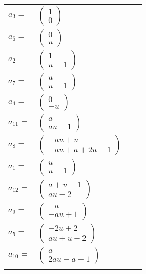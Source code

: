 \documentclass[1p]{elsarticle_modified}
\theoremstyle{definition}
\begin{document}
\begin{tabular}{m{7pt} m{180pt} m{7pt} m{180pt} }
\flushright $a_{3}=$&$\begin{pmatrix}1\\0\end{pmatrix}$ \\
\flushright $a_{6}=$&$\begin{pmatrix}0\\u\end{pmatrix}$ \\
\flushright $a_{2}=$&$\begin{pmatrix}1\\u-1\end{pmatrix}$ \\
\flushright $a_{7}=$&$\begin{pmatrix}u\\u-1\end{pmatrix}$ \\
\flushright $a_{4}=$&$\begin{pmatrix}0\\- u\end{pmatrix}$ \\
\flushright $a_{11}=$&$\begin{pmatrix}a\\a u-1\end{pmatrix}$ \\
\flushright $a_{8}=$&$\begin{pmatrix}- a u+u\\- a u+a+2 u-1\end{pmatrix}$ \\
\flushright $a_{1}=$&$\begin{pmatrix}u\\u-1\end{pmatrix}$ \\
\flushright $a_{12}=$&$\begin{pmatrix}a+u-1\\a u-2\end{pmatrix}$ \\
\flushright $a_{9}=$&$\begin{pmatrix}- a\\- a u+1\end{pmatrix}$ \\
\flushright $a_{5}=$&$\begin{pmatrix}-2 u+2\\a u+u+2\end{pmatrix}$ \\
\flushright $a_{10}=$&$\begin{pmatrix}a\\2 a u- a-1\end{pmatrix}$\\&\end{tabular}
\end{document}
